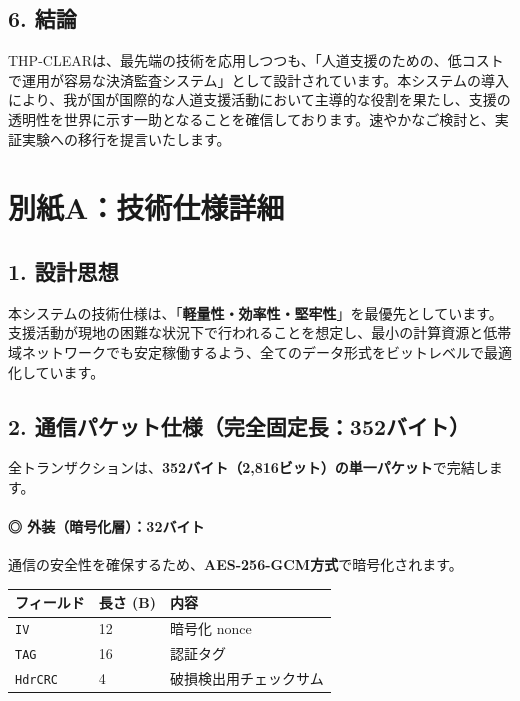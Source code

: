 \documentclass[
  a4paper,
  ja=standard,
  xelatex]{bxjsarticle}
\begin{document}
\subsection{\texorpdfstring{\textbf{6.
結論}}{6. 結論}}\label{ux7d50ux8ad6}

THP-CLEARは、最先端の技術を応用しつつも、「人道支援のための、低コストで運用が容易な決済監査システム」として設計されています。本システムの導入により、我が国が国際的な人道支援活動において主導的な役割を果たし、支援の透明性を世界に示す一助となることを確信しております。速やかなご検討と、実証実験への移行を提言いたします。

\section{\texorpdfstring{\textbf{別紙A：技術仕様詳細}}{別紙A：技術仕様詳細}}\label{ux5225ux7d19aux6280ux8853ux4ed5ux69d8ux8a73ux7d30}

\subsection{\texorpdfstring{\textbf{1.
設計思想}}{1. 設計思想}}\label{ux8a2dux8a08ux601dux60f3}

本システムの技術仕様は、「\textbf{軽量性・効率性・堅牢性}」を最優先としています。支援活動が現地の困難な状況下で行われることを想定し、最小の計算資源と低帯域ネットワークでも安定稼働するよう、全てのデータ形式をビットレベルで最適化しています。

\subsection{\texorpdfstring{\textbf{2.
通信パケット仕様（完全固定長：352バイト）}}{2. 通信パケット仕様（完全固定長：352バイト）}}\label{ux901aux4fe1ux30d1ux30b1ux30c3ux30c8ux4ed5ux69d8ux5b8cux5168ux56faux5b9aux9577352ux30d0ux30a4ux30c8}

全トランザクションは、\textbf{352バイト（2,816ビット）の単一パケット}で完結します。

\paragraph{\texorpdfstring{\textbf{◎
外装（暗号化層）：32バイト}}{◎ 外装（暗号化層）：32バイト}}\label{ux5916ux88c5ux6697ux53f7ux5316ux5c6432ux30d0ux30a4ux30c8}

通信の安全性を確保するため、\textbf{AES-256-GCM方式}で暗号化されます。

\begin{longtable}[]{@{}lll@{}}
\toprule\noalign{}
フィールド & 長さ (B) & 内容 \\
\midrule\noalign{}
\endhead
\bottomrule\noalign{}
\endlastfoot
\texttt{IV} & 12 & 暗号化 nonce \\
\texttt{TAG} & 16 & 認証タグ \\
\texttt{HdrCRC} & 4 & 破損検出用チェックサム \\
\end{longtable}
\end{document}
